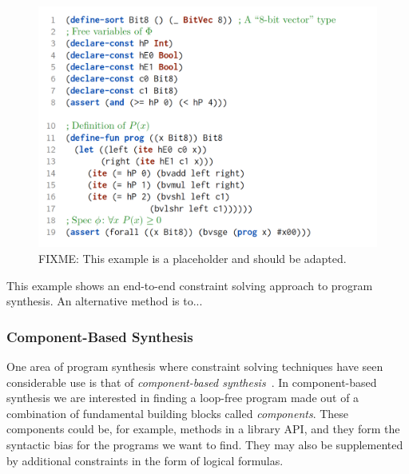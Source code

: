 \begin{figure}[h!]
  \centering
  \includegraphics[width=\textwidth]{assets/constraint-solving-smtlib.png}
  \caption{FIXME: This example is a placeholder and should be adapted.}
\end{figure}

This example shows an end-to-end constraint solving approach to program
synthesis. An alternative method is to...


\subsubsection{Component-Based Synthesis}
\label{sec:components}


One area of program synthesis where constraint solving techniques have seen
considerable use is that of \textit{component-based
synthesis}~\cite{Shi:2019:FCS,Feng:2018:PSU,Feng:2017:CST,Feng:2017:CSC,Jha:oracle:2010}.
In component-based synthesis we are interested in finding a loop-free program
made out of a combination of fundamental building blocks called
\textit{components}. These components could be, for example, methods in a
library API, and they form the syntactic bias for the programs we want to find.
They may also be supplemented by additional constraints in the form of logical
formulas.





